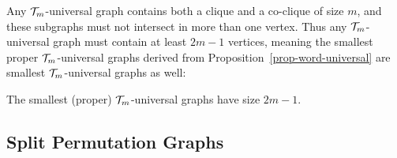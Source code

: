 Any $\mathcal{T}_m$-universal graph contains both a clique and a co-clique of size $m$, and these subgraphs must not intersect in more than one vertex. Thus any $\mathcal{T}_m$-universal graph must contain at least $2m-1$ vertices, meaning the smallest proper $\mathcal{T}_m$-universal graphs derived from Proposition~\ref{prop-word-universal} are smallest $\mathcal{T}_m$-universal graphs as well:
\begin{corollary}
\label{cor-graphs-threshold-improper}
	The smallest (proper) $\mathcal{T}_m$-universal graphs have size $2m-1$.
\end{corollary}

\subsection{Split Permutation Graphs}

